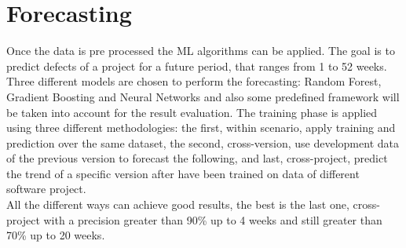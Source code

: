 \documentclass{article}
\begin{document}
\section{Forecasting}
Once the data is pre processed the ML algorithms can be applied. The goal is to predict defects of a project for a future period, that ranges from 1 to 52 weeks.
Three different models are chosen to perform the forecasting: Random Forest, Gradient Boosting and Neural Networks and also some predefined framework will be taken into account for the result evaluation.
The training phase is applied using three different methodologies: the first, within scenario, apply training and prediction over the same dataset, the second, cross-version, use development data of the previous version to forecast the following, and last, cross-project, predict the trend of a specific version after have been trained on data of different software project.\\
All the different ways can achieve good results, the best is the last one, cross-project with a precision greater than 90\% up to 4 weeks and still greater than 70\% up to 20 weeks. 
\end{document}
